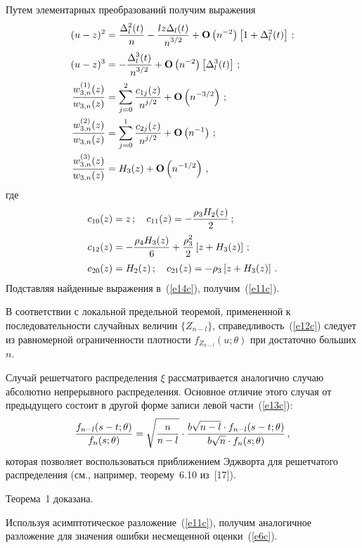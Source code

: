 \begin{multicols}{2}
  Путем элементарных преобразований получим выражения
  \begin{align*}   
(u-z)^2&=\displaystyle\frac{\displaystyle \Delta_l^2(t)\mathstrut}{\displaystyle n\mathstrut}-\displaystyle\frac{\displaystyle lz\Delta_l(t)\mathstrut}{\displaystyle n^{3/2}\mathstrut}+
       {\bf O}\left(n^{-2}\right)\left [1+\Delta_l^2(t)\right ]\,;\\
       (u-z)^3&=-\displaystyle\frac{\displaystyle \Delta_l^3(t)\mathstrut}{\displaystyle n^{3/2}\mathstrut}+
       {\bf O}\left(n^{-2}\right)\left [\Delta_l^3(t)\right ]\,;\\
  \displaystyle\frac{\displaystyle w_{3,n}^{(1)}(z)\mathstrut}{\displaystyle w_{3,n}(z)\mathstrut}&=\sum_{j=0}^2
       \displaystyle\frac{\displaystyle c_{1j}(z)\mathstrut}{\displaystyle n^{j/2}\mathstrut}+{\bf O}\left(n^{-3/2}\right)\,;\\
 \displaystyle\frac{\displaystyle w_{3,n}^{(2)}(z)\mathstrut}{\displaystyle w_{3,n}(z)\mathstrut}&=\sum_{j=0}^1
       \displaystyle\frac{\displaystyle c_{2j}(z)\mathstrut}{\displaystyle n^{j/2}\mathstrut}+{\bf O}\left(n^{-1}\right)\,;\\
      \displaystyle\frac{\displaystyle w_{3,n}^{(3)}(z)\mathstrut}{\displaystyle w_{3,n}(z)\mathstrut}&=H_3(z)+
       {\bf O}\left(n^{-1/2}\right)\,,
\end{align*}
  где
\begin{align*}   
c_{10}(z)&=z\,;\quad c_{11}(z)=-\displaystyle\frac{\displaystyle \rho_3H_2(z)\mathstrut}{\displaystyle 2\mathstrut}\,;\\
c_{12}(z)&=-\displaystyle\frac{\displaystyle \rho_4H_3(z)\mathstrut}{\displaystyle 6\mathstrut}+ \displaystyle\frac{\displaystyle \rho_3^2\mathstrut}{\displaystyle 2\mathstrut}\left[z+ H_3(z)\right]\,;\\
c_{20}(z)&=H_2(z)\,;\quad c_{21}(z)=-\rho_3\left[z+ H_3(z)\right]\,.
\end{align*}
  Подставляя найденные выражения в~(\ref{e14c}), получим~(\ref{e11c}).

  В соответствии с локальной предельной теоремой, примененной к
  последовательности случайных величин $\{Z_{n-l}\}$,
  справедливость~(\ref{e12c}) следует из равномерной ограниченности
  плотности $f_{Z_{n-l}}(u;\theta)$ при достаточно больших $n$.

  Случай решетчатого распределения $\xi$ рас\-смат\-ри\-ва\-ет\-ся
  аналогично случаю абсолютно непрерывного распределения. Основное
  отличие этого случая от предыдущего состоит в другой форме
  записи левой части~(\ref{e13c}):
  $$ 
\displaystyle\frac{\displaystyle f_{n-l}(s-t;\theta)\mathstrut}{\displaystyle f_n(s;\theta)\mathstrut}=\sqrt{\displaystyle\frac{\displaystyle n\mathstrut}{\displaystyle n-l\mathstrut}}
     \cdot \displaystyle\frac{\displaystyle b\sqrt{n-l}\cdot f_{n-l}(s-t;\theta)\mathstrut}{\displaystyle b\sqrt{n}\cdot f_{n}(s;\theta)\mathstrut}\,,
  $$
  которая позволяет воспользоваться приближением Эджворта для
  решетчатого распределения (см., например, теорему~6.10 из~[17]).

  Теорема~1 доказана.

  Используя асимптотическое разложение~(\ref{e11c}), получим аналогичное
  разложение для значения ошибки несмещенной оценки~(\ref{e6c}).

  \medskip


\end{multicols}
